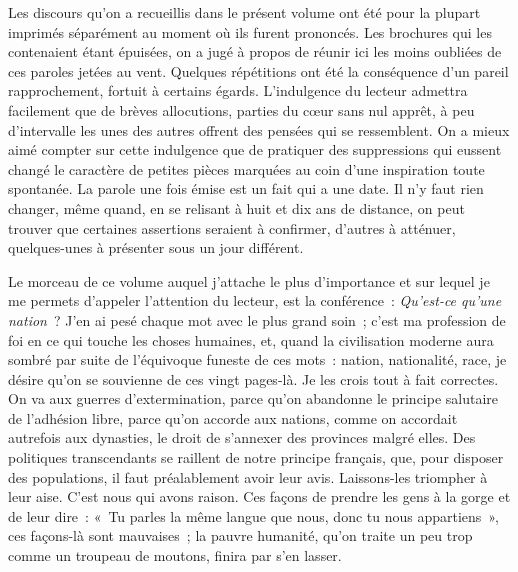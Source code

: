 \documentclass[french,twoside]{book} %
\begin{document}
\noindent Les discours qu’on a recueillis dans le présent volume ont été pour la plupart imprimés séparément au moment où ils furent prononcés. Les brochures qui les contenaient étant épuisées, on a jugé à propos de réunir ici les moins oubliées de ces paroles jetées au vent. Quelques répétitions ont été la conséquence d’un pareil rapprochement, fortuit à certains égards. L’indulgence du lecteur admettra facilement que de brèves allocutions, parties du cœur sans nul apprêt, à peu d’intervalle les unes des autres offrent des pensées qui se ressemblent. On a mieux aimé compter sur cette indulgence que de pratiquer des suppressions qui eussent changé le caractère de petites pièces marquées au coin d’une inspiration toute spontanée. La parole une fois émise est un fait qui a une date. Il n’y faut rien changer, même quand, en se relisant à huit et dix ans de distance, on peut trouver que certaines assertions seraient à confirmer, d’autres à atténuer, quelques-unes à présenter sous un jour différent.\par
Le morceau de ce volume auquel j’attache le plus d’importance et sur lequel je me permets d’appeler l’attention du lecteur, est la conférence : \emph{Qu’est-ce qu’une nation} ? J’en ai pesé chaque mot avec le plus grand soin ; c’est ma profession de foi en ce qui touche les choses humaines, et, quand la civilisation moderne aura sombré par suite de l’équivoque funeste de ces mots : nation, nationalité, race, je désire qu’on se souvienne de ces vingt pages-là. Je les crois tout à fait correctes. On va aux guerres d’extermination, parce qu’on abandonne le principe salutaire de l’adhésion libre, parce qu’on accorde aux nations, comme on accordait autrefois aux dynasties, le droit de s’annexer des provinces malgré elles. Des politiques transcendants se raillent de notre principe français, que, pour disposer des populations, il faut préalablement avoir leur avis. Laissons-les triompher à leur aise. C’est nous qui avons raison. Ces façons de prendre les gens à la gorge et de leur dire : « Tu parles la même langue que nous, donc tu nous appartiens », ces façons-là sont mauvaises ; la pauvre humanité, qu’on traite un peu trop comme un troupeau de moutons, finira par s’en lasser.\par
\end{document}
